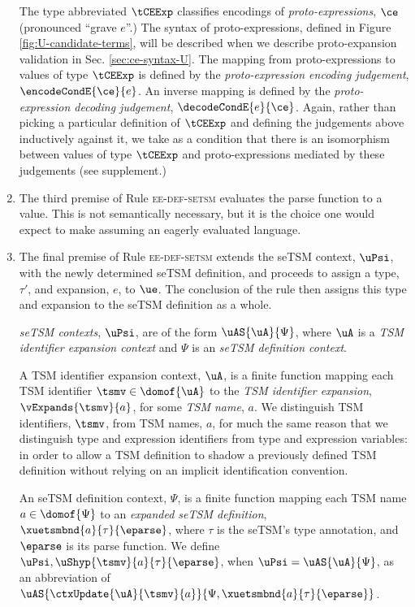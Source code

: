 \documentclass[acmlarge,review,anonymous]{acmart}\settopmatter{printfolios=true}
\begin{document}
\begin{enumerate}
The type abbreviated $\tCEExp$ classifies encodings of \emph{proto-expressions}, $\ce$ (pronounced ``grave $e$''.) The syntax of proto-expressions, defined in Figure \ref{fig:U-candidate-terms}, will be described when we describe proto-expansion validation in Sec. \ref{sec:ce-syntax-U}. The mapping from proto-expressions to values of type $\tCEExp$ is defined by the \emph{proto-expression encoding judgement}, $\encodeCondE{\ce}{e}$. An inverse mapping is defined by the \emph{proto-expression decoding judgement}, $\decodeCondE{e}{\ce}$. Again, rather than picking a particular definition of $\tCEExp$ and defining the judgements above inductively against it, we take as a condition that there is an isomorphism between values of type $\tCEExp$ and proto-expressions mediated by these judgements (see supplement.)
\item The third premise of Rule \textsc{ee-def-setsm} evaluates the parse function to a value. This is not semantically necessary, but it is the choice one would expect to make assuming an eagerly evaluated language.
\item The final premise of Rule \textsc{ee-def-setsm} extends the seTSM context, $\uPsi$, with the newly determined {seTSM definition}, and proceeds to assign a type, $\tau'$, and expansion, $e$, to $\ue$. The conclusion of the rule then assigns this type and expansion to the seTSM definition as a whole.%



\emph{seTSM contexts}, $\uPsi$, are of the form $\uAS{\uA}{\Psi}$, where $\uA$ is a \emph{TSM identifier expansion context} and $\Psi$ is an \emph{seTSM definition context}. 

A {TSM identifier expansion context}, $\uA$, is a finite function mapping each TSM identifier $\tsmv \in \domof{\uA}$ to the \emph{TSM identifier expansion}, $\vExpands{\tsmv}{a}$, for some \emph{TSM name}, $a$. We distinguish TSM identifiers, $\tsmv$, from TSM names, $a$, for much the same reason that we distinguish type and expression identifiers from type and expression variables: in order to allow a TSM definition to shadow a previously defined TSM definition without relying on an implicit identification convention.

An {seTSM definition context}, $\Psi$, is a finite function mapping each TSM name $a \in \domof{\Psi}$ to an \emph{expanded seTSM definition}, $\xuetsmbnd{a}{\tau}{\eparse}$, where $\tau$ is the seTSM's type annotation, and $\eparse$ is its parse function. 
We define $\uPsi, \uShyp{\tsmv}{a}{\tau}{\eparse}$, when $\uPsi=\uAS{\uA}{\Psi}$, as an abbreviation of $\uAS{\ctxUpdate{\uA}{\tsmv}{a}}{\Psi, \xuetsmbnd{a}{\tau}{\eparse}}$.


\end{enumerate}
\end{document}

